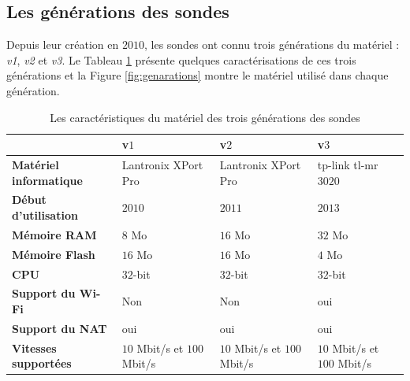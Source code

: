 \subsection{Les générations des sondes}

Depuis leur création   en $2010$, les sondes  ont connu   trois générations du matériel : \textit{v1}, \textit{v2} et \textit{v3}. Le Tableau   \ref{tab:differents-generations-probes} présente quelques  caractérisations de ces trois générations  et  la Figure 	\ref{fig:genarations} montre le matériel utilisé  dans chaque génération.


\begin{table}[H]
	\begin{tabularx}{\textwidth}{|X|X|X|X|}
		\hline
		&\textbf{v$ 1 $}&\textbf{v$ 2 $}&\textbf{v$ 3 $} \\ \hline
		\textbf{Matériel informatique}  & Lantronix XPort Pro \cite{LantronixXPortPro} &Lantronix XPort Pro \cite{LantronixXPortPro}&tp-link tl-mr$ 3020  $  \\ \hline
		\textbf{Début d'utilisation}  &$2010$&$2011$&$2013$ \\ \hline
		\textbf{Mémoire RAM} & $8$ Mo&$16$ Mo& $32$ Mo\\ \hline
		\textbf{Mémoire Flash} & $16$ Mo&$16$ Mo&$4$ Mo \\ \hline
		\textbf{CPU} &$ 32 $-bit& $ 32 $-bit & $ 32 $-bit\\ \hline
		\textbf{Support du Wi-Fi} &Non&Non&oui \\ \hline
		\textbf{Support du NAT} &oui&oui&oui \\ \hline
		\textbf{Vitesses supportées} &$ 10 $ Mbit/s et $ 100 $ Mbit/s&$ 10 $ Mbit/s et $ 100 $ Mbit/s&$ 10 $ Mbit/s et $ 100 $ Mbit/s \\ \hline
	\end{tabularx}
	\caption{Les caractéristiques du matériel  des trois générations des sondes}
	\label{tab:differents-generations-probes}
\end{table}



